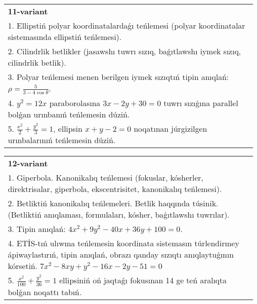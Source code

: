 \documentclass{article}
\begin{document}
\begin{tabular}{m{17cm}}
\textbf{11-variant}\\
1. Ellipstiń polyar koordinatalardaǵı teńlemesi (polyar koordinatalar sistemasında ellipstiń teńlemesi).\\

2. Cilindrlik betlikler (jasawshı tuwrı sızıq, baǵıtlawshı iymek sızıq, cilindrlik betlik).\\

3. Polyar teńlemesi menen berilgen iymek sızıqtıń tipin anıqlań: $\rho=\frac{5}{3-4\cos\theta}$.\\

4. $y^{2} = 12x$ paraborolasına $3x - 2y + 30 = 0$ tuwrı sızıǵına parallel bolǵan urınbanıń teńlemesin dúziń.  \\

5. $\frac{x^{2}}{2} + \frac{y^{2}}{3} = 1$, ellipsin $x + y - 2 = 0$ noqatınan júrgizilgen urınbalarınıń teńlemesin dúziń.  
\end{tabular}
\vspace{1cm}


\begin{tabular}{m{17cm}}
\textbf{12-variant}\\
1. Giperbola. Kanonikalıq teńlemesi (fokuslar, kósherler, direktrisalar, giperbola, ekscentrisitet, kanonikalıq teńlemesi).\\

2. Betliktiń kanonikalıq teńlemeleri. Betlik haqqında túsinik. (Betliktiń anıqlaması, formulaları, kósher, baǵıtlawshı tuwrılar).\\

3. Tipin anıqlań: $4 x^2+9 y^2-40 x+36 y+100=0$.\\

4. ETİS-tıń ulıwma teńlemesin koordinata sistemasın túrlendirmey ápiwaylastırıń, tipin anıqlań, obrazı qanday sızıqtı anıqlaytuǵının kórsetiń. $7x^{2} - 8xy + y^{2} - 16x - 2y - 51 = 0$  \\

5. $\frac{x^{2}}{100} + \frac{y^{2}}{36} = 1$ ellipsiniń oń jaqtaǵı fokusınan 14 ge teń aralıqta bolǵan noqattı tabıń.  
\end{tabular}
\vspace{1cm}
\end{document}
